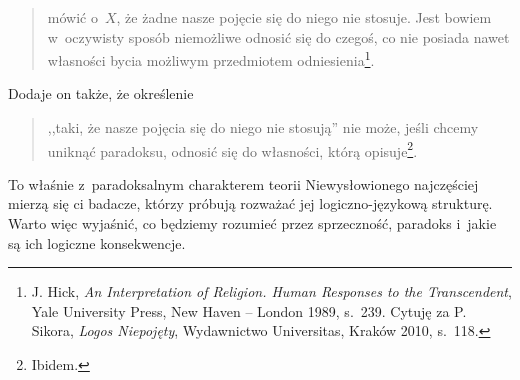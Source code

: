 \begin{quote}
mówić o~$X$, że żadne nasze pojęcie się do niego nie stosuje. Jest bowiem w~oczywisty sposób niemożliwe odnosić się do czegoś, co nie posiada nawet własności bycia możliwym przedmiotem odniesienia\footnote{J. Hick, \textit{An Interpretation of Religion. Human Responses to the Transcendent}, Yale University Press, New Haven -- London 1989, s.~239. Cytuję za P. Sikora, \textit{Logos Niepojęty}, Wydawnictwo Universitas, Kraków 2010, s.~118.}.

\end{quote}
Dodaje on także, że określenie

\begin{quote}
,,taki, że nasze pojęcia się do niego nie stosują'' nie może, jeśli chcemy uniknąć paradoksu, odnosić się do własności, którą opisuje\footnote{Ibidem.}.
\end{quote}

To właśnie z~paradoksalnym charakterem teorii Niewysłowionego najczęściej mierzą się ci badacze, którzy próbują rozważać jej logiczno-językową strukturę. Warto więc wyjaśnić, co będziemy rozumieć przez sprzeczność, paradoks i~jakie są ich logiczne konsekwencje.

